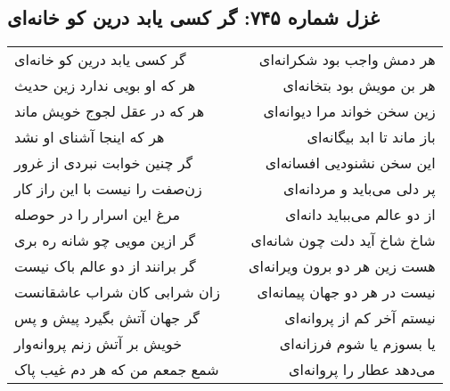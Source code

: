 \begin{center}
\section*{غزل شماره ۷۴۵: گر کسی یابد درین کو خانه‌ای}
\label{sec:745}
\begin{longtable}{l p{0.5cm} r}
گر کسی یابد درین کو خانه‌ای
&&
هر دمش واجب بود شکرانه‌ای
\\
هر که او بویی ندارد زین حدیث
&&
هر بن مویش بود بتخانه‌ای
\\
هر که در عقل لجوج خویش ماند
&&
زین سخن خواند مرا دیوانه‌ای
\\
هر که اینجا آشنای او نشد
&&
باز ماند تا ابد بیگانه‌ای
\\
گر چنین خوابت نبردی از غرور
&&
این سخن نشنودیی افسانه‌ای
\\
زن‌صفت را نیست با این راز کار
&&
پر دلی می‌باید و مردانه‌ای
\\
مرغ این اسرار را در حوصله
&&
از دو عالم می‌بباید دانه‌ای
\\
گر ازین مویی چو شانه ره بری
&&
شاخ شاخ آید دلت چون شانه‌ای
\\
گر برانند از دو عالم باک نیست
&&
هست زین هر دو برون ویرانه‌ای
\\
زان شرابی کان شراب عاشقانست
&&
نیست در هر دو جهان پیمانه‌ای
\\
گر جهان آتش بگیرد پیش و پس
&&
نیستم آخر کم از پروانه‌ای
\\
خویش بر آتش زنم پروانه‌وار
&&
یا بسوزم یا شوم فرزانه‌ای
\\
شمع جمعم من که هر دم غیب پاک
&&
می‌دهد عطار را پروانه‌ای
\\
\end{longtable}
\end{center}
